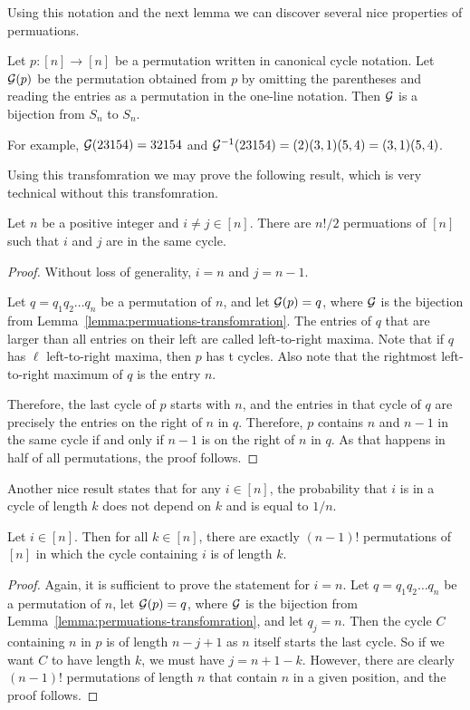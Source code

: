 Using this notation and the next lemma we can discover several nice properties
of permuations.
\begin{lemma}
\label{lemma:permuations-transfomration}
  Let $p : [n] \to [n]$ be a permutation written in canonical cycle notation.
  Let $\mathcal{G}(p)$ be the permutation obtained from $p$ by omitting the
  parentheses and reading the entries as a permutation in the one-line notation.
  Then $\mathcal{G}$ is a bijection from $S_n$ to $S_n$.
\end{lemma}
For example, $\mathcal{G}(2 3 1 5 4) = 32154$ and
$\mathcal{G}^{-1}(2 3 1 5 4) = (2) (3, 1) (5, 4) = (3, 1) (5, 4)$.

Using this transfomration we may prove the following result, which is very
technical without this transfomration.
\begin{theorem}
  Let $n$ be a positive integer and $i \neq j \in [n]$. There are $n! / 2$
  permuations of $[n]$ such that $i$ and $j$ are in the same cycle.
\end{theorem}
\begin{proof}
  Without loss of generality, $i = n$ and $j = n - 1$.

  Let $q = q_1 q_2 \dots q_n$ be a permutation of $n$, and let $\mathcal{G}(p) = q$,
  where $\mathcal{G}$ is the bijection from Lemma~\ref{lemma:permuations-transfomration}.
  The entries of $q$ that are larger than all entries on their left are called
  left-to-right maxima. Note that if $q$ has $\ell$ left-to-right maxima,
  then $p$ has t cycles. Also note that the rightmost left-to-right maximum of
  $q$ is the entry $n$.

  Therefore, the last cycle of $p$ starts with $n$, and the entries in that
  cycle of $q$ are precisely the entries on the right of $n$ in $q$. Therefore,
  $p$ contains $n$ and $n - 1$ in the same cycle if and only if $n - 1$ is on
  the right of $n$ in $q$. As that happens in half of all permutations, the
  proof follows.
\end{proof}

Another nice result states that for any $i \in [n]$, the probability that
$i$ is in a cycle of length $k$ does not depend on $k$ and is equal to $1 / n$.
\begin{theorem}
  Let $i \in [n]$. Then for all $k \in [n]$, there are exactly $(n - 1)!$
  permutations of $[n]$ in which the cycle containing $i$ is of length $k$.
\end{theorem}
\begin{proof}
  Again, it is sufficient to prove the statement for $i = n$. Let
  $q = q_1 q_2 \dots q_n$ be a permutation of $n$, let $\mathcal{G}(p) = q$, where
  $\mathcal{G}$ is the bijection from Lemma~\ref{lemma:permuations-transfomration},
  and let  $q_j = n$. Then the cycle $C$ containing $n$ in $p$ is of length
  $n - j + 1$ as $n$ itself starts the last cycle. So if we want $C$ to have
  length $k$, we must have $j = n + 1 - k$. However, there are clearly
  $(n - 1)!$ permutations of length $n$ that contain $n$ in a given position,
  and the proof follows.
\end{proof}

